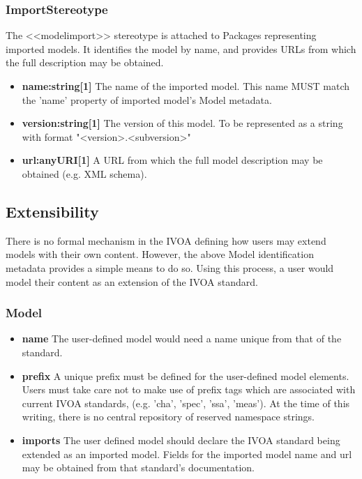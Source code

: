   \subsubsection{ImportStereotype}
  The <<modelimport>> stereotype is attached to Packages representing imported
  models. It identifies the model by name, and provides URLs from which the full
  description may be obtained.
  \begin{itemize}
  \item \textbf{name:string[1]} \newline
    The name of the imported model. This name MUST match the 'name' property of
    imported model's Model metadata.
  \item \textbf{version:string[1]} \newline
    The version of this model. To be represented as a string with format "<version>.<subversion>"
  \item \textbf{url:anyURI[1]} \newline
    A URL from which the full model description may be obtained (e.g. XML schema).
  \end{itemize}
  

\pagebreak
\subsection{Extensibility}
There is no formal mechanism in the IVOA defining how users may extend models
with their own content. However, the above Model identification metadata
provides a simple means to do so. Using this process, a user would model their
content as an extension of the IVOA standard.

  \subsubsection{Model}
    \begin{itemize}
    \item \textbf{name} \newline
      The user-defined model would need a name unique from that of the standard.
    \item \textbf{prefix} \newline
      A unique prefix must be defined for the user-defined model elements. Users
      must take care not to make use of prefix tags which are associated with
      current IVOA standards, (e.g. ’cha’, ’spec’, ’ssa’, ’meas’). At the time of
      this writing, there is no central repository of reserved namespace strings.
    \item \textbf{imports} \newline
      The user defined model should declare the IVOA standard being extended as
      an imported model. Fields for the imported model name and url may be obtained
      from that standard's documentation.
    \end{itemize}

